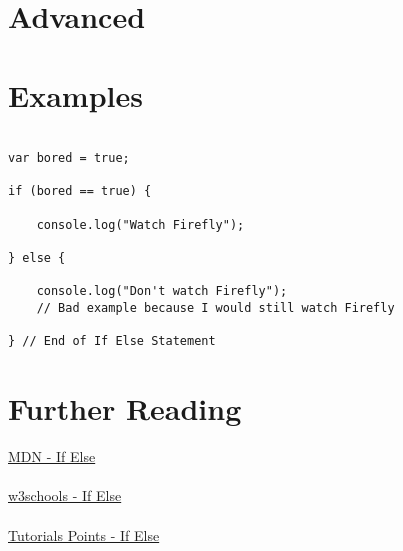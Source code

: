 \documentclass[12pt, letterpaper]{article}
\begin{document}
\section*{Advanced}



\section*{Examples}

\begin{lstlisting}

var bored = true;

if (bored == true) {

	console.log("Watch Firefly");

} else {

	console.log("Don't watch Firefly");
	// Bad example because I would still watch Firefly

} // End of If Else Statement

\end{lstlisting}
\section*{Further Reading}
\href{https://developer.mozilla.org/en-US/docs/Web/JavaScript/Reference/Statements/if...else}{MDN - If Else}\\
\\
\href{http://www.w3schools.com/js/js_if_else.asp}{w3schools - If Else}\\
\\
\href{https://www.tutorialspoint.com/javascript/javascript_ifelse.htm}{Tutorials Points - If Else}
\end{document}
